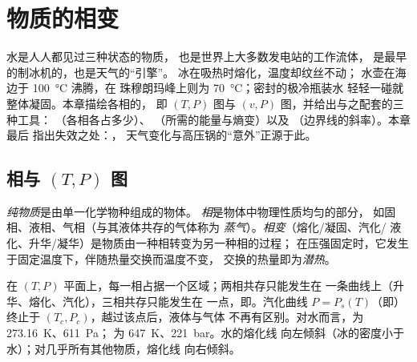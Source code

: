 \chapter{物质的相变}\label{ch:b1:phase-changes}

水是人人都见过三种状态的物质，
也是世界上大多数发电站的工作流体，
是最早的制冰机的，也是天气的“引擎”。
冰在吸热时熔化，温度却纹丝不动；
水壶在海边于 \qty{100}{\degreeCelsius} 沸腾，在
珠穆朗玛峰上则为 \qty{70}{\degreeCelsius}；密封的极冷瓶装水
轻轻一碰就整体凝固。本章描绘各相的，
即 $(T, P)$ 图与 $(v, P)$ 图，并给出与之配套的三种工具：
（各相各占多少）、
（所需的能量与熵变）以及
（边界线的斜率）。本章最后
指出失效之处：，
天气变化与高压锅的“意外”正源于此。

\section{相与 $(T, P)$ 图}

\begin{definition}[纯物质、相、相变]\label{def:b1:phase-changes:phase}
\emph{纯物质}是由单一化学物种组成的物体。
\emph{相}是物体中物理性质均匀的部分，
如固相、液相、气相（与其液体共存的气体称为
\emph{蒸气}）。\emph{相变}（熔化/凝固、汽化/
液化、升华/凝华）是物质由一种相转变为另一种相的过程；
在压强固定时，它发生于固定温度下，伴随热量交换而温度不变，
交换的热量即为\emph{潜热}。
\end{definition}

\begin{proposition}[平衡相图]\label{prop:b1:phase-changes:PTdiagram}
在 $(T, P)$ 平面上，每一相占据一个区域；两相共存只能发生在
一条曲线上（升华、熔化、汽化），三相共存只能发生在
一点，即\emph{}。汽化曲线
$P = P_s(T)$（即\emph{}）终止于
\emph{} $(T_c, P_c)$，越过该点后，液体与气体
不再有区别。对水而言，为 \qty{273.16}{K}、\qty{611}{Pa}；
为 \qty{647}{K}、\qty{221}{bar}。水的熔化线
向左倾斜（冰的密度小于水）；对几乎所有其他物质，熔化线
向右倾斜。
\end{proposition}
\admitted

